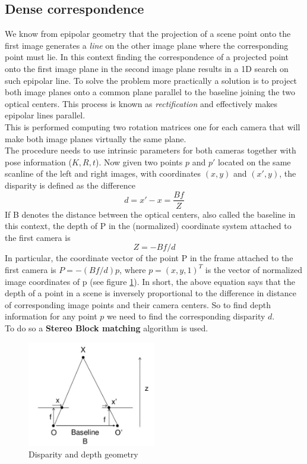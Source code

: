 \documentclass[12pt]{amsart}
\begin{document}
\subsection{Dense correspondence}
We know from epipolar geometry that the projection of a scene point onto the first image generates a \textit{line} on the other image plane where the corresponding point must lie.
In this context finding the correspondence of a projected point onto the first image plane in the second image plane results in a 1D search on such epipolar line.
To solve the problem more practically a solution is to project both image planes onto a common plane parallel to the baseline joining the two optical centers. This process is known as 
\textit{rectification} and effectively makes epipolar lines parallel.\\
This is performed computing two rotation matrices one for each camera that will make both image planes virtually the same plane.\\ 
The procedure needs to use intrinsic parameters for both cameras together with pose information (\(K, R, t\)).
Now given two points \(p\) and \(p'\) located on the same scanline of the left and right images, with coordinates \((x, y)\) and \((x', y)\), 
the disparity is defined as the difference \[d = x' - x = \frac{Bf}{Z} \]
If B denotes the distance between the optical centers, also called the baseline in this context, 
the depth of P in the (normalized) coordinate system attached to the first camera is \[Z = -Bf/d\] 
In particular, the coordinate vector of the point P in the frame attached to the first camera is 
\(P = -(Bf/d)p\), where \(p = (x,y,1)^T\) is the vector of normalized image coordinates of p (see figure \ref{fig:disp}).
In short, the above equation says that the depth of a point in a scene is inversely proportional to the difference in distance of corresponding image points and their camera centers. 
So to find depth information for any point \(p\) we need to find the corresponding disparity \(d\).\\ 
To do so a \textbf{Stereo Block matching} algorithm is used.
\begin{figure}[h]
    \includegraphics[width=0.5\textwidth]{disparity}
    \caption{Disparity and depth geometry}
    \label{fig:disp}
\end{figure}
\end{document}
